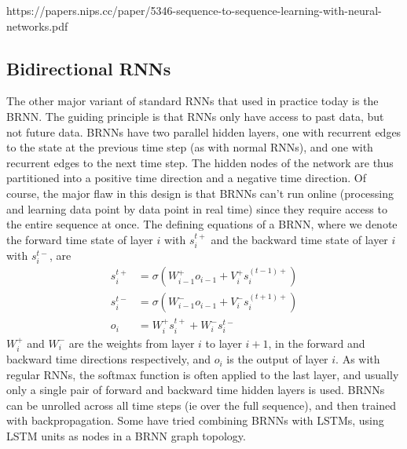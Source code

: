 \documentclass{article}
\begin{document}
https://papers.nips.cc/paper/5346-sequence-to-sequence-learning-with-neural-networks.pdf

\subsection{Bidirectional RNNs}
    The other major variant of standard RNNs that used in practice today is the BRNN. The guiding principle is that RNNs only have access to past data, but not future data. BRNNs have two parallel hidden layers, one with recurrent edges to the state at the previous time step (as with normal RNNs), and one with recurrent edges to the next time step. The hidden nodes of the network are thus partitioned into a positive time direction and a negative time direction. Of course, the major flaw in this design is that BRNNs can't run online (processing and learning data point by data point in real time) since they require access to the entire sequence at once. The defining equations of a BRNN, where we denote the forward time state of layer $ i $ with $ s_i^{t+} $ and the backward time state of layer $ i $ with $ s_i^{t-} $, are
$$ \begin{aligned}
    s_i^{t+} &= \sigma \left( W_{i - 1}^+ o_{i - 1} + V_i^+ s_i^{(t - 1)+} \right) \\
    s_i^{t-} &= \sigma \left( W_{i - 1}^- o_{i - 1} + V_i^- s_i^{(t + 1)+} \right) \\
    o_i &= W_i^+ s_i^{t+} + W_i^- s_i^{t-}
\end{aligned} $$
$ W_i^+ $ and $ W_i^- $ are the weights from layer $ i $ to layer $ i + 1 $, in the forward and backward time directions respectively, and $ o_i $ is the output of layer $ i $. As with regular RNNs, the softmax function is often applied to the last layer, and usually only a single pair of forward and backward time hidden layers is used. BRNNs can be unrolled across all time steps (ie over the full sequence), and then trained with backpropagation. Some have tried combining BRNNs with LSTMs, using LSTM units as nodes in a BRNN graph topology.
\end{document}
